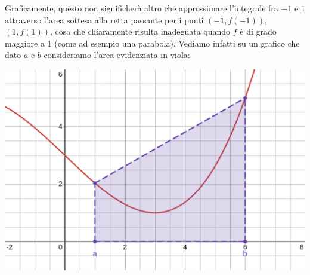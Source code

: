 \documentclass[a4paper,11pt]{article}
\begin{document}
Graficamente, questo non significherà altro che approssimare l'integrale fra $-1$ e $1$ attraverso l'area sottesa alla retta passante per i punti $(-1, f(-1))$, $(1, f(1))$, cosa che chiaramente risulta inadeguata quando $f$ è di grado maggiore a 1 (come ad esempio una parabola).
Vediamo infatti su un grafico che dato $a$ e $b$ consideriamo l'area evidenziata in viola:
\begin{center}
	\includegraphics[scale=0.28]{../figures/trapezoidal_approx.png}
\end{center}
\end{document}
